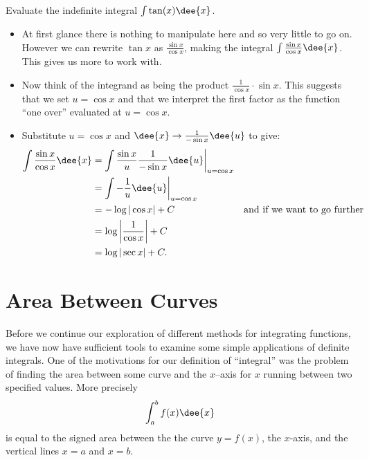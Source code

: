 \begin{eg}\label{eg:substitution9}
Evaluate the indefinite integral $\int \tan(x) \dee{x}$.

\soln
\begin{itemize}
 \item At first glance there is nothing to manipulate here and so very little to go on.
However we can rewrite $\tan x$ as $\frac{\sin x}{\cos x}$, making the integral $\int
\frac{\sin x}{\cos x}\dee{x}$. This gives us more to work with.

\item Now think of the integrand as being the product $\frac{1}{\cos x}\cdot \sin
x$. This suggests that we set $u=\cos x$ and that we interpret the first factor as the
function ``one over'' evaluated at $u=\cos x$.
\item Substitute $u = \cos x$ and $\dee{x} \rightarrow \frac{1}{-\sin x}\dee{u}$ to give:
\begin{align*}
  \int \frac{\sin x}{\cos x}\dee{x}
&=\int \frac{\sin x}{u} \frac{1}{-\sin x} \dee{u} \bigg|_{u=\cos x} \\
&= \int -\frac{1}{u}\dee{u}  \bigg|_{u=\cos x}\\
&= -\log|\cos x| +C & \text{and if we want to go further}\\
&= \log\left|\frac{1}{\cos x} \right|+C\\
&= \log|\sec x| +C.
\end{align*}
\end{itemize}


\end{eg}

\section{Area Between Curves}\label{sec area}
Before we continue our exploration of different methods for integrating functions, we
have now have sufficient tools to examine some simple applications of definite integrals.
One of the motivations for our definition of ``integral'' was the problem of finding
the area between some curve and the $x$--axis for $x$ running between two
specified values. More precisely
\begin{align*}
  \int_a^b f(x) \dee{x}
\end{align*}
is equal to the signed area between the the curve $y=f(x)$, the $x$-axis, and the
vertical lines $x=a$ and $x=b$.

